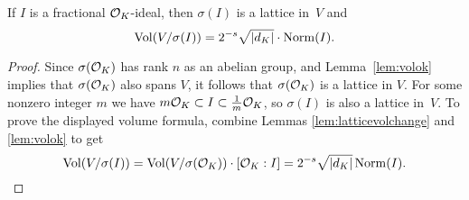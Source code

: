 \begin{lemma}\label{lem:volfracideal}
	If $I$ is a fractional $\mathcal{O}_K$-ideal, then $\sigma(I)$ is
	a lattice in~$V$ and
	$$
		\operatorname{Vol}(V/\sigma(I)) = 2^{-s}\sqrt{|d_K|}\cdot \operatorname{Norm}(I).
	$$
\end{lemma}
\begin{proof}
	Since $\sigma(\mathcal{O}_K)$ has rank $n$ as an abelian group, and
	Lemma~\ref{lem:volok} implies that $\sigma(\mathcal{O}_K)$ also spans $V$,
	it follows that $\sigma(\mathcal{O}_K)$ is a lattice in $V$.
	For some nonzero integer $m$ we have
	$m\mathcal{O}_K \subset I \subset \frac{1}{m}\mathcal{O}_K$,
	so $\sigma(I)$ is also a lattice in~$V$.
	To prove the displayed volume
	formula, combine Lemmas
	\ref{lem:latticevolchange} and \ref{lem:volok} to get
	$$
	\operatorname{Vol}(V/\sigma(I))
	= \operatorname{Vol}(V/\sigma(\mathcal{O}_K))\cdot[\mathcal{O}_K:I]
	= 2^{-s}\sqrt{|d_K|}\operatorname{Norm}(I).
	$$
\end{proof}


